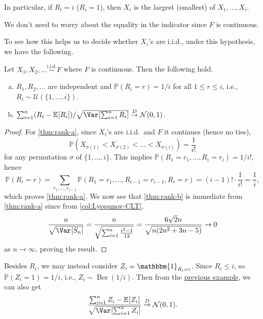 \begin{eg}
	In particular, if \(R_i = i\) (\(R_i = 1\)), then \(X_i\) is the largest (smallest) of \(X_1, \dots , X_i\).
\end{eg}

\begin{note}
	We don't need to worry about the equality in the indicator since \(F\) is continuous.
\end{note}

To see how this helps us to decide whether \(X_i\)'s are i.i.d., under this hypothesis, we have the following.

\begin{theorem}\label{thm:rank}
	Let \(X_1, X_2 , \dots \overset{\text{i.i.d.} }{\sim } F\) where \(F\) is continuous. Then the following hold.
	\begin{enumerate}[(a)]
		\item\label{thm:rank-a} \(R_1, R_2, \dots \) are independent and \(\mathbb{P} (R_i = r) = 1 / i\) for all \(1 \leq r \leq i\), i.e., \(R_i \sim \mathcal{U} (\{ 1, \dots , i \} )\).
		\item\label{thm:rank-b} \(\sum_{i=1}^{n} (R_i - \mathbb{E}_{}[R_i] ) / \sqrt{\Var_{}[\sum_{i=1}^{n} R_i] } \overset{D}{\to} \mathcal{N} (0, 1)\).
	\end{enumerate}
\end{theorem}
\begin{proof}
	For \autoref{thm:rank-a}, since \(X_i\)'s are i.i.d.\ and \(F\) it continues (hence no ties),
	\[
		\mathbb{P} (X_{\sigma (1)} < X_{\sigma (2)} < \dots < X_{\sigma (i)})
		= \frac{1}{i!}
	\]
	for any permutation \(\sigma \) of \(\{ 1, \dots , i \} \). This implies \(\mathbb{P} (R_1 = r_1, \dots , R_i = r_i) = 1 / i!\), hence
	\[
		\mathbb{P} (R_i = r)
		= \sum_{r_1, \dots , r_{i-1}} \mathbb{P} (R_1 = r_1 , \dots , R_{i-1} = r_{i-1} , R_i = r)
		= (i - 1)! \cdot \frac{1}{i!}
		= \frac{1}{i},
	\]
	which proves \autoref{thm:rank-a}. We now see that \autoref{thm:rank-b} is immediate from \autoref{thm:rank-a} since from \autoref{col:Lyopunov-CLT},
	\[
		\frac{n}{\sqrt{\Var_{}[S_n] }}
		= \frac{n}{\sqrt{\sum_{i=1}^{n} \frac{i^2 - 1}{12}}}
		= \frac{6 \sqrt{2} n}{\sqrt{n (2 n^{2} + 3 n - 5)}}
		\to 0
	\]
	as \(n \to \infty \), proving the result.
\end{proof}

\begin{remark}
	Besides \(R_i\), we may instead consider \(Z_i = \mathbbm{1}_{R_i = i} \). Since \(R_i \leq i\), so \(\mathbb{P} (Z_i = 1) = 1 / i\), i.e., \(Z_i \sim \operatorname{Ber}(1 / i) \). Then from the \hyperref[eg:Lyopunov-CLT]{previous example}, we can also get
	\[
		\frac{\sum_{i=1}^{n} Z_i - \mathbb{E}_{}[Z_i] }{\sqrt{\Var_{}[\sum_{i=1}^{n} Z_i] } }
		\overset{D}{\to} \mathcal{N} (0, 1).
	\]
\end{remark}

